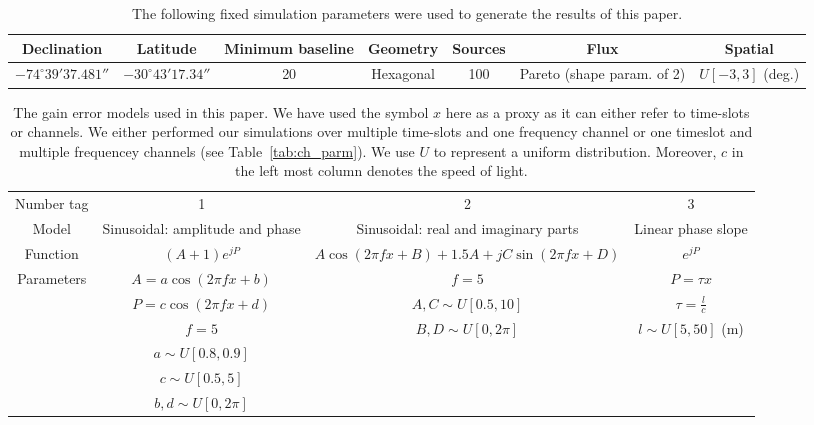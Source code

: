\documentclass[useAMS,usenatbib]{mn2e}
\begin{document}


\begin{table}
\centering
\caption{The following fixed simulation parameters were used to generate the results of this paper.}
\begin{tabular}{|c c c c c c c|} 
\hline
Declination & Latitude & Minimum baseline & Geometry& Sources & Flux & Spatial \\
\hline 
\hline
 $-74^{\circ}39'37.481''$ & $-30^{\circ}43'17.34''$ & 20 & Hexagonal &100 & Pareto (shape param. of 2) & $U[-3,3]$ (deg.) 
\end{tabular}
\label{tab:fixed_parm}
\end{table}

\begin{table}
\centering
\caption{The gain error models used in this paper. We have used the symbol $x$ here as a proxy as it can either refer to time-slots or channels. We either
performed our simulations over multiple time-slots and one frequency channel or one timeslot and multiple frequencey channels (see Table~\ref{tab:ch_parm}). We use $U$ to represent 
a uniform distribution. Moreover, $c$ in the left most column denotes the speed of light.}
\begin{tabular}{|c c c c|} 
\hline
Number tag & 1 & 2 & 3\\
Model & Sinusoidal: amplitude and phase & Sinusoidal: real and imaginary parts & Linear phase slope \\ [0.5ex] 
\hline\hline
Function & $(A+1)e^{jP}$ & $A\cos(2\pi fx+B)+1.5A+jC\sin(2\pi fx+D)$ & $e^{jP}$ \\ 
\hline
Parameters & $A=a\cos(2\pi fx +b)$  & $f=5$ & $P=\tau x$ \\
 & $P =c \cos(2\pi fx +d)$ & $A,C\sim U[0.5,10]$ & $\tau = \frac{l}{c}$ \\
 & $f=5$ & $B,D\sim U[0,2\pi]$ &  $l\sim U[5,50]$ (m)\\
 & $a\sim U[0.8,0.9]$ &  & \\ 
 & $c\sim U[0.5,5]$ &  &  \\ 
 & $b,d\sim U[0,2\pi]$ &  &  \\ 
\hline
\end{tabular}
\label{tab:gain_parm}
\end{table}
\end{document}
